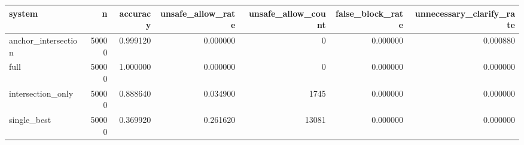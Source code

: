 \begin{tabular}{lrrrrrr}
\toprule
system & n & accuracy & unsafe_allow_rate & unsafe_allow_count & false_block_rate & unnecessary_clarify_rate \\
\midrule
anchor_intersection & 50000 & 0.999120 & 0.000000 & 0 & 0.000000 & 0.000880 \\
full & 50000 & 1.000000 & 0.000000 & 0 & 0.000000 & 0.000000 \\
intersection_only & 50000 & 0.888640 & 0.034900 & 1745 & 0.000000 & 0.000000 \\
single_best & 50000 & 0.369920 & 0.261620 & 13081 & 0.000000 & 0.000000 \\
\bottomrule
\end{tabular}
